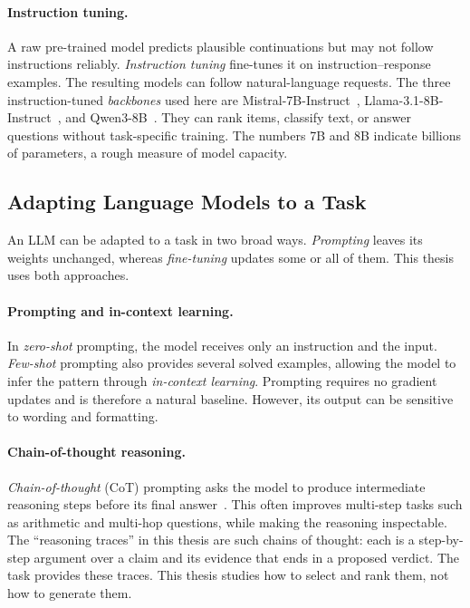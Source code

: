 \paragraph{Instruction tuning.}
A raw pre-trained model predicts plausible continuations but may not follow instructions reliably.
\emph{Instruction tuning} fine-tunes it on instruction--response examples. The resulting models can
follow natural-language requests. The three instruction-tuned \emph{backbones} used here are
Mistral-7B-Instruct~\cite{jiang2023mistral7b}, Llama-3.1-8B-Instruct~\cite{llama31instruct}, and
Qwen3-8B~\cite{qwen3technicalreport}. They can rank items, classify text, or answer questions without
task-specific training. The numbers 7B and 8B indicate billions of parameters, a rough measure of
model capacity.

\subsection{Adapting Language Models to a Task}
\label{subsec:bg-adapt}

An LLM can be adapted to a task in two broad ways. \emph{Prompting} leaves its weights unchanged,
whereas \emph{fine-tuning} updates some or all of them. This thesis uses both approaches.

\paragraph{Prompting and in-context learning.}
In \emph{zero-shot} prompting, the model receives only an instruction and the input. \emph{Few-shot}
prompting also provides several solved examples, allowing the model to infer the pattern through
\emph{in-context learning}. Prompting requires no gradient updates and is therefore a natural
baseline. However, its output can be sensitive to wording and formatting.

\paragraph{Chain-of-thought reasoning.}
\emph{Chain-of-thought} (CoT) prompting asks the model to produce intermediate reasoning steps before
its final answer~\cite{WeiWSB23}. This often improves multi-step tasks such as arithmetic and
multi-hop questions, while making the reasoning inspectable. The ``reasoning traces'' in this thesis
are such chains of thought: each is a step-by-step argument over a claim and its evidence that ends in
a proposed verdict. The task provides these traces. This thesis studies how to select and rank them,
not how to generate them.

